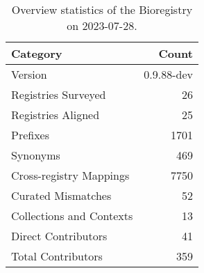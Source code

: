 \begin{table}
\caption{Overview statistics of the Bioregistry on 2023-07-28.}
\label{tab:bioregistry-summary}
\begin{tabular}{lr}
\toprule
Category & Count \\
\midrule
Version & 0.9.88-dev \\
Registries Surveyed & 26 \\
Registries Aligned & 25 \\
Prefixes & 1701 \\
Synonyms & 469 \\
Cross-registry Mappings & 7750 \\
Curated Mismatches & 52 \\
Collections and Contexts & 13 \\
Direct Contributors & 41 \\
Total Contributors & 359 \\
\bottomrule
\end{tabular}
\end{table}
